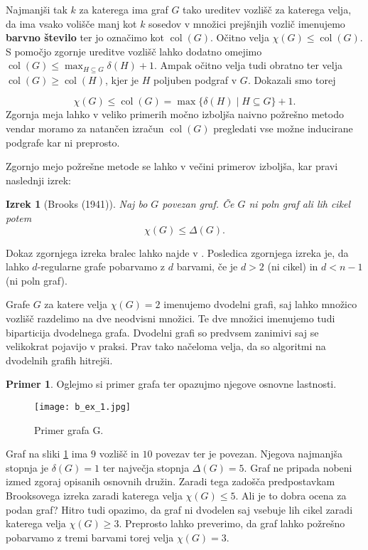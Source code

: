 \documentclass[12pt,a4paper,twoside]{article}
\theoremstyle{definition} %
\newtheorem{primer}[definicija]{Primer}
\theoremstyle{plain} %
\newtheorem{izrek}[definicija]{Izrek}
\numberwithin{equation}{section}  %
\DeclareMathOperator{\col}{col}
\begin{document}
Najmanjši tak $k$ za katerega ima graf $G$ tako ureditev vozlišč za katerega velja, da ima vsako volišče manj kot $k$ sosedov v množici prejšnjih vozlič  imenujemo \textbf{barvno število} ter jo označimo kot $\col(G)$. Očitno velja $\chi(G) \le \col(G)$. S pomočjo zgornje ureditve vozlišč lahko dodatno omejimo $\col(G) \le  \max_{H \subseteq G} \delta(H) + 1$. Ampak očitno velja tudi obratno ter velja $\col(G) \ge \col(H)$, kjer je $H$ poljuben podgraf v $G$. Dokazali smo torej 

$$ \chi(G) \le \col(G) = \max\{\delta(H) \mid H \subseteq G\} + 1.$$
Zgornja meja lahko v veliko primerih močno izboljša naivno požrešno metodo vendar moramo za natančen izračun $\col(G)$ pregledati vse možne inducirane podgrafe kar ni preprosto.

Zgornjo mejo požrešne metode se lahko v večini primerov izboljša, kar pravi naslednji izrek:
\begin{izrek}[Brooks (1941)]
Naj bo $G$ povezan graf. Če $G$ ni poln graf ali lih cikel potem
$$\chi(G) \le \Delta(G) .$$

\end{izrek}
Dokaz zgornjega izreka bralec lahko najde v \cite{maingraph}. Posledica zgornjega izreka je, da lahko $d$-regularne grafe pobarvamo z $d$ barvami, če je $d> 2$ (ni cikel) in $d < n-1$ (ni poln graf).

Grafe $G$ za katere velja $\chi(G) = 2$ imenujemo dvodelni grafi, saj lahko množico vozlišč razdelimo na dve neodvisni množici. Te dve množici imenujemo tudi biparticija dvodelnega grafa. Dvodelni grafi so predvsem zanimivi saj se velikokrat pojavijo v praksi. Prav tako načeloma velja, da so algoritmi na dvodelnih grafih hitrejši. 

\begin{primer}
Oglejmo si primer grafa ter opazujmo njegove osnovne lastnosti.
 \begin{figure}[h!]
\caption{Primer grafa G.}
\label{basic_ex}
\centering
    \texttt{[image: b\_ex\_1.jpg]}
    \end{figure}
Graf na sliki \ref{basic_ex} ima $9$ vozlišč in $10$ povezav ter je povezan. Njegova najmanjša stopnja je $\delta(G) = 1$ ter največja stopnja $\Delta(G) = 5$. Graf ne pripada nobeni izmed zgoraj opisanih osnovnih družin. Zaradi tega zadošča predpostavkam Brooksovega izreka zaradi katerega velja $\chi(G) \le 5$. Ali je to dobra ocena za podan graf? Hitro tudi opazimo, da graf ni dvodelen saj vsebuje lih cikel zaradi katerega velja $\chi(G) \ge 3$. Preprosto lahko preverimo, da graf lahko požrešno pobarvamo z tremi barvami torej velja $\chi(G) = 3$.
\end{primer}
\end{document}
